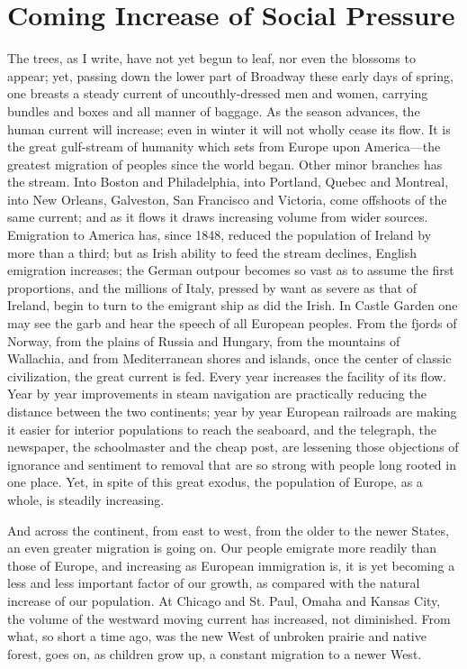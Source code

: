 \documentclass{book}
\begin{document}
\chapter{Coming Increase of Social Pressure}
\label{chapter-3}
The trees, as I write, have not yet begun to leaf, nor even the blossoms to appear; yet, passing down the lower part of Broadway these early days of spring, one breasts a steady current of uncouthly-dressed men and women, carrying bundles and boxes and all manner of baggage. As the season advances, the human current will increase; even in winter it will not wholly cease its flow. It is the great gulf-stream of humanity which sets from Europe upon America—the greatest migration of peoples since the world began. Other minor branches has the stream. Into Boston and Philadelphia, into Portland, Quebec and Montreal, into New Orleans, Galveston, San Francisco and Victoria, come offshoots of the same current; and as it flows it draws increasing volume from wider sources. Emigration to America has, since 1848, reduced the population of Ireland by more than a third; but as Irish ability to feed the stream declines, English emigration increases; the German outpour becomes so vast as to assume the first proportions, and the millions of Italy, pressed by want as severe as that of Ireland, begin to turn to the emigrant ship as did the Irish. In Castle Garden one may see the garb and hear the speech of all European peoples. From the fjords of Norway, from the plains of Russia and Hungary, from the mountains of Wallachia, and from Mediterranean shores and islands, once the center of classic civilization, the great current is fed. Every year increases the facility of its flow. Year by year improvements in steam navigation are practically reducing the distance between the two continents; year by year European railroads are making it easier for interior populations to reach the seaboard, and the telegraph, the newspaper, the schoolmaster and the cheap post, are lessening those objections of ignorance and sentiment to removal that are so strong with people long rooted in one place. Yet, in spite of this great exodus, the population of Europe, as a whole, is steadily increasing.

And across the continent, from east to west, from the older to the newer States, an even greater migration is going on. Our people emigrate more readily than those of Europe, and increasing as European immigration is, it is yet becoming a less and less important factor of our growth, as compared with the natural increase of our population. At Chicago and St. Paul, Omaha and Kansas City, the volume of the westward moving current has increased, not diminished. From what, so short a time ago, was the new West of unbroken prairie and native forest, goes on, as children grow up, a constant migration to a newer West.
\end{document}
